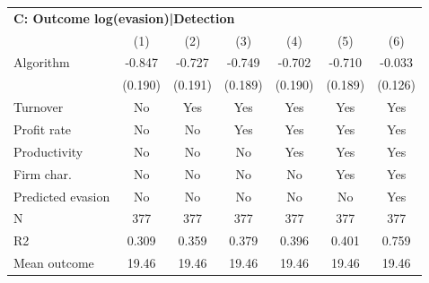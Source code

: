 \begin{tabular}{lcccccc}
\midrule \multicolumn{7}{l}{\textbf{C: Outcome log(evasion)|Detection}} \\ \multicolumn{1}{l}{} & (1) & (2) & (3) & (4) & (5) & (6) \\ \midrule
Algorithm   &      -0.847\sym{***}&      -0.727\sym{***}&      -0.749\sym{***}&      -0.702\sym{***}&      -0.710\sym{***}&      -0.033         \\
            &     (0.190)         &     (0.191)         &     (0.189)         &     (0.190)         &     (0.189)         &     (0.126)         \\
\midrule
Turnover    &          No         &         Yes         &         Yes         &         Yes         &         Yes         &         Yes         \\
Profit rate &          No         &          No         &         Yes         &         Yes         &         Yes         &         Yes         \\
Productivity&          No         &          No         &          No         &         Yes         &         Yes         &         Yes         \\
Firm char.  &          No         &          No         &          No         &          No         &         Yes         &         Yes         \\
Predicted evasion&          No         &          No         &          No         &          No         &          No         &         Yes         \\
N           &         377         &         377         &         377         &         377         &         377         &         377         \\
R2          &       0.309         &       0.359         &       0.379         &       0.396         &       0.401         &       0.759         \\
Mean outcome&       19.46         &       19.46         &       19.46         &       19.46         &       19.46         &       19.46         \\
\bottomrule \end{tabular}
